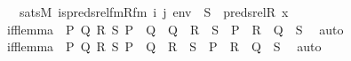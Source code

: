 \begin{isabellebody}
\ \ \ {\isachardoublequoteopen}sats{\isacharparenleft}{\kern0pt}M{\isacharcomma}{\kern0pt}\ is{\isacharunderscore}{\kern0pt}preds{\isacharunderscore}{\kern0pt}rel{\isacharunderscore}{\kern0pt}fm{\isacharparenleft}{\kern0pt}Rfm{\isacharcomma}{\kern0pt}\ i{\isacharcomma}{\kern0pt}\ j{\isacharparenright}{\kern0pt}{\isacharcomma}{\kern0pt}\ env{\isacharparenright}{\kern0pt}\ {\isasymlongleftrightarrow}\ S\ {\isacharequal}{\kern0pt}\ preds{\isacharunderscore}{\kern0pt}rel{\isacharparenleft}{\kern0pt}R{\isacharcomma}{\kern0pt}\ x{\isacharparenright}{\kern0pt}{\isachardoublequoteclose}\ \isanewline
%
\isadelimproof
%
\endisadelimproof
%
\isatagproof
{}\isamarkupfalse%
\ {\isacharminus}{\kern0pt}\ \isanewline
\ \ \isamarkupfalse%
\ iff{\isacharunderscore}{\kern0pt}lemma\ {\isacharcolon}{\kern0pt}\ {\isachardoublequoteopen}{\isasymAnd}P\ Q\ R\ S{\isachardot}{\kern0pt}\ {\isacharparenleft}{\kern0pt}P\ {\isasymlongleftrightarrow}\ Q{\isacharparenright}{\kern0pt}\ {\isasymLongrightarrow}\ {\isacharparenleft}{\kern0pt}Q\ {\isasymLongrightarrow}\ R\ {\isasymlongleftrightarrow}\ S{\isacharparenright}{\kern0pt}\ {\isasymLongrightarrow}\ {\isacharparenleft}{\kern0pt}P\ {\isasymand}\ R{\isacharparenright}{\kern0pt}\ {\isasymlongleftrightarrow}\ {\isacharparenleft}{\kern0pt}Q\ {\isasymand}\ S{\isacharparenright}{\kern0pt}{\isachardoublequoteclose}\ \isamarkupfalse%
\ auto\isanewline
\ \ \isamarkupfalse%
\ iff{\isacharunderscore}{\kern0pt}lemma{}\ {\isacharcolon}{\kern0pt}\ {\isachardoublequoteopen}{\isasymAnd}P\ Q\ R\ S{\isachardot}{\kern0pt}\ {\isacharparenleft}{\kern0pt}P\ {\isasymlongleftrightarrow}\ Q{\isacharparenright}{\kern0pt}\ {\isasymLongrightarrow}\ {\isacharparenleft}{\kern0pt}R\ {\isasymlongleftrightarrow}\ S{\isacharparenright}{\kern0pt}\ {\isasymLongrightarrow}\ {\isacharparenleft}{\kern0pt}P\ {\isasymlongleftrightarrow}\ R{\isacharparenright}{\kern0pt}\ {\isasymlongleftrightarrow}\ {\isacharparenleft}{\kern0pt}Q\ {\isasymlongleftrightarrow}\ S{\isacharparenright}{\kern0pt}{\isachardoublequoteclose}\ \isamarkupfalse%
\ auto\isanewline
\ \ \isamarkupfalse%

\end{isabellebody}
